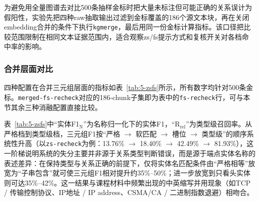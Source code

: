 为避免用全量图谱去对比500条抽样金标时把大量未标注但可能正确的关系误计为假阳性，实验先把四种raw抽取输出过滤到金标覆盖的186个源文本块，再在关闭embedding合并的条件下执行\texttt{kgmerge}，最后用同一份金标计算指标。该口径把比较范围限制在相同文本证据范围内，适合观察zs/fs提示方式和复核开关对各档命中率的影响。

\subsubsection{合并层面对比}

四种配置在合并三元组层面的指标如表~\ref{tab:5-zsfs}所示，所有数字均针对500条金标。\texttt{merged-fs-recheck}对应的186-chunk子集即为表中的\texttt{fs-recheck}行，可与本节其余三种消融配置直接比较。

\begin{table}[ht]
    \centering
    \caption{零样本/少样本$\times$有/无LLM复核 在500条金标上的多档匹配结果}
    \label{tab:5-zsfs}
\end{table}

表~\ref{tab:5-zsfs}中“实体F1$_\text{N}$”为名称归一化下的实体F1，“R$_\text{rel}$”为类型级召回率。从严格档到类型级档，三元组F1按“严格 $\to$ 软匹配 $\to$ 槽位 $\to$ 类型级”的顺序系统性升高（以\texttt{zs-recheck}为例：13.76\% $\to$ 18.40\% $\to$ 42.49\% $\to$ 81.93\%），这一阶梯说明系统的失分主要并非源于关系类型判断错误，而是源于端点实体名称的表述差异：在保持类型与关系正确的前提下，仅将实体名匹配条件由“严格相等”放宽为“子串包含”就可使三元组F1相对提升约35\%--50\%；进一步放宽到只看头实体则可达35\%--42\%。这一结果与课程材料中频繁出现的中英缩写并用现象（如TCP / 传输控制协议、IP地址 / IP address、CSMA/CA / 二进制指数退避）相吻合。

